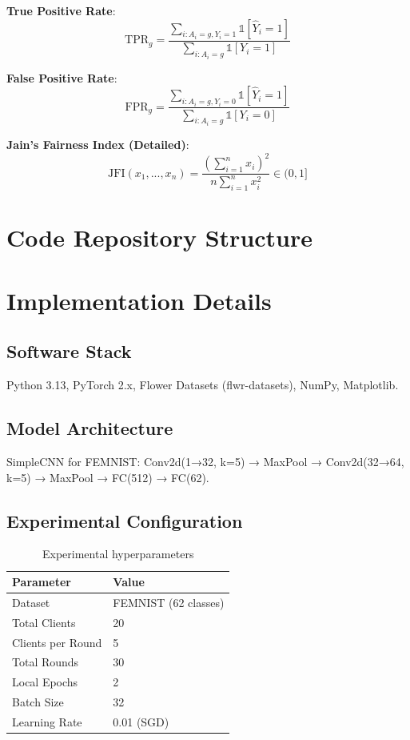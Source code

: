 \documentclass{article}
\begin{document}
\textbf{True Positive Rate}:
\begin{equation}
\text{TPR}_g = \frac{\sum_{i:A_i=g, Y_i=1} \mathbb{1}[\hat{Y}_i=1]}{\sum_{i:A_i=g} \mathbb{1}[Y_i=1]}
\end{equation}

\textbf{False Positive Rate}:
\begin{equation}
\text{FPR}_g = \frac{\sum_{i:A_i=g, Y_i=0} \mathbb{1}[\hat{Y}_i=1]}{\sum_{i:A_i=g} \mathbb{1}[Y_i=0]}
\end{equation}

\textbf{Jain's Fairness Index (Detailed)}:
\begin{equation}
\text{JFI}(x_1, ..., x_n) = \frac{\left(\sum_{i=1}^{n} x_i\right)^2}{n \sum_{i=1}^{n} x_i^2} \in (0, 1]
\end{equation}

\section{Code Repository Structure}


\appendix

\section{Implementation Details}

\subsection{Software Stack}
Python 3.13, PyTorch 2.x, Flower Datasets (flwr-datasets), NumPy, Matplotlib.

\subsection{Model Architecture}

SimpleCNN for FEMNIST: Conv2d(1→32, k=5) → MaxPool → Conv2d(32→64, k=5) → MaxPool → FC(512) → FC(62).

\subsection{Experimental Configuration}

\begin{table}[t]
\centering
\small
\begin{tabular}{@{}ll@{}}
\toprule
\textbf{Parameter} & \textbf{Value} \\
\midrule
Dataset & FEMNIST (62 classes) \\
Total Clients & 20 \\
Clients per Round & 5 \\
Total Rounds & 30 \\
Local Epochs & 2 \\
Batch Size & 32 \\
Learning Rate & 0.01 (SGD) \\
\bottomrule
\end{tabular}
\caption{Experimental hyperparameters}
\label{tab:hyperparams}
\end{table}
\end{document}
